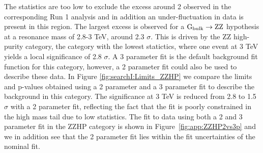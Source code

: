 The statistics are too low to exclude the excess around 2 \TeV observed in the corresponding Run 1 analysis and in addition an under-fluctuation in data is present in this region. The largest excess is observed for a $\mathrm{G}_\mathrm{bulk} \rightarrow \mathrm{Z}\mathrm{Z}$ hypothesis at a resonance mass of 2.8-3 TeV, around 2.3 $\sigma$.
This is driven by the ZZ high-purity category, the category with the lowest statictics, where one event at 3 TeV yields a local significance of 2.8 $\sigma$. A 3 parameter fit is the default background fit function for this category, however, a 2 parameter fit could also be used to describe these data. In Figure \ref{fig:searchI:Limits_ZZHP} we compare the limits and p-values obtained using a 2 parameter and a 3 parameter fit to describe the background in this category. The significance at 3 TeV is reduced from 2.8 to 1.5 $\sigma$ with a 2 parameter fit, reflecting the fact that the fit is poorly constrained in the high mass tail due to low statistics. The fit to data using both a 2 and 3 parameter fit in the ZZHP category is shown in Figure~\ref{fig:app:ZZHP2vs3p} and we in addition see that the 2 parameter fit lies within the fit uncertainties of the nominal fit.\newline
\newline

